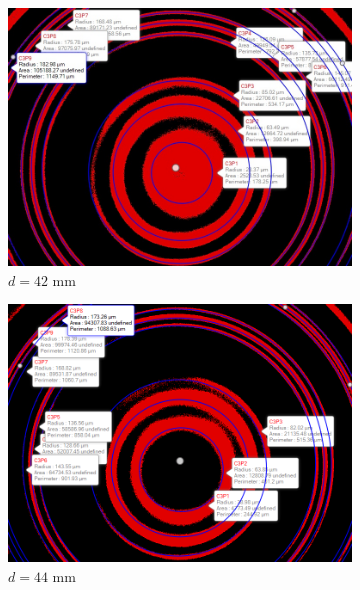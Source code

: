\begin{figure}
\begin{subfigure}[b]{0.45\textwidth}
        \includegraphics[width=\textwidth]{images/42.jpg}
        \caption{$d=42$ mm}
    \end{subfigure}
    \hfill
    \begin{subfigure}[b]{0.45\textwidth}
        \centering
        \includegraphics[width=\textwidth]{images/44.png}
        \caption{$d=44$ mm}
    \end{subfigure}
    \hfill
    \begin{subfigure}[b]{0.45\textwidth}
        \centering

\end{subfigure}
\end{figure}
